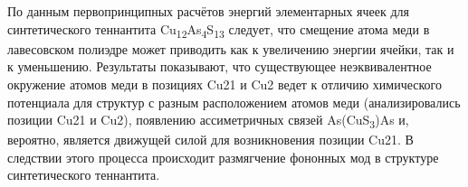 По данным первопринципных расчётов энергий элементарных ячеек для синтетического теннантита Cu\textsubscript{12}As\textsubscript{4}S\textsubscript{13} следует,  что смещение атома меди в лавесовском полиэдре может приводить как к увеличению энергии ячейки, так и к уменьшению.
Результаты показывают, что существующее неэквивалентное  окружение атомов меди в позициях Cu21 и Cu2 ведет к отличию химического потенциала для структур с разным расположением атомов меди (анализировались позиции Cu21 и Cu2), появлению ассиметричных связей As(CuS\textsubscript{3})As и, вероятно, является движущей силой для возникновения позиции Cu21. В следствии этого процесса происходит размягчение фононных мод в структуре синтетического теннантита.

% 
% 
% 
% 

\newpage
